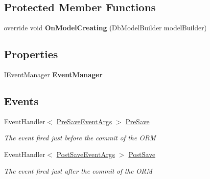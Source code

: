 \subsection*{Protected Member Functions}
\begin{DoxyCompactItemize}
\item 
\hypertarget{class_highway_1_1_data_1_1_entity_framework_1_1_contexts_1_1_entity_framework_context_aaf3b39746258acf1cc5e14467c5e795d}{override void {\bfseries On\-Model\-Creating} (Db\-Model\-Builder model\-Builder)}\label{class_highway_1_1_data_1_1_entity_framework_1_1_contexts_1_1_entity_framework_context_aaf3b39746258acf1cc5e14467c5e795d}

\end{DoxyCompactItemize}
\subsection*{Properties}
\begin{DoxyCompactItemize}
\item 
\hypertarget{class_highway_1_1_data_1_1_entity_framework_1_1_contexts_1_1_entity_framework_context_aefd1b923c2414387cddd0a579608039d}{\hyperlink{interface_highway_1_1_data_1_1_interfaces_1_1_i_event_manager}{I\-Event\-Manager} {\bfseries Event\-Manager}}\label{class_highway_1_1_data_1_1_entity_framework_1_1_contexts_1_1_entity_framework_context_aefd1b923c2414387cddd0a579608039d}

\end{DoxyCompactItemize}
\subsection*{Events}
\begin{DoxyCompactItemize}
\item 
Event\-Handler$<$ \hyperlink{class_highway_1_1_data_1_1_interceptors_1_1_events_1_1_pre_save_event_args}{Pre\-Save\-Event\-Args} $>$ \hyperlink{class_highway_1_1_data_1_1_entity_framework_1_1_contexts_1_1_entity_framework_context_a4e307f212412dfd562cd70640d67709b}{Pre\-Save}
\begin{DoxyCompactList}\small\item\em The event fired just before the commit of the O\-R\-M \end{DoxyCompactList}\item 
Event\-Handler$<$ \hyperlink{class_highway_1_1_data_1_1_interceptors_1_1_events_1_1_post_save_event_args}{Post\-Save\-Event\-Args} $>$ \hyperlink{class_highway_1_1_data_1_1_entity_framework_1_1_contexts_1_1_entity_framework_context_a2297153144a3e1240cb4526eb963b889}{Post\-Save}
\begin{DoxyCompactList}\small\item\em The event fired just after the commit of the O\-R\-M \end{DoxyCompactList}\end{DoxyCompactItemize}


